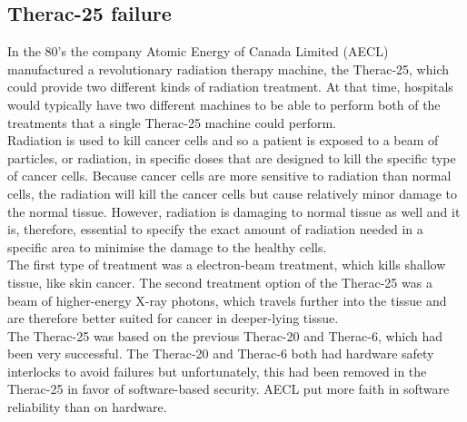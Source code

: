 \subsection{Therac-25 failure}
In the 80's the company Atomic Energy of Canada Limited (AECL) manufactured a revolutionary radiation therapy machine, the Therac-25\cite{Leveson1993}, which could provide two different kinds of radiation treatment. At that time, hospitals would typically have two different machines to be able to perform both of the treatments that a single Therac-25 machine could perform.\\
Radiation is used to kill cancer cells and so a patient is exposed to a beam of particles, or radiation, in specific doses that are designed to kill the specific type of cancer cells. Because cancer cells are more sensitive to radiation than normal cells, the radiation will kill the cancer cells but cause relatively minor damage to the normal tissue. However, radiation is damaging to normal tissue as well and it is, therefore, essential to specify the exact amount of radiation needed in a specific area to minimise the damage to the healthy cells.\\

The first type of treatment was a electron-beam treatment, which kills shallow tissue, like skin cancer. The second treatment option of the Therac-25 was a beam of higher-energy X-ray photons, which travels further into the tissue and are therefore better suited for cancer in deeper-lying tissue. \\

The Therac-25 was based on the previous Therac-20 and Therac-6, which had been very successful. The Therac-20 and Therac-6 both had hardware safety interlocks to avoid failures but unfortunately, this had been removed in the Therac-25 in favor of software-based security. AECL put more faith in software reliability than on hardware. \\

